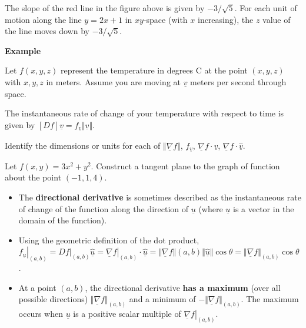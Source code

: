 \documentclass[12pt,letterpaper,noanswers]{exam}
\newcommand{\mb}[1]{\underline{#1}}
\begin{document}
The slope of the red line in the figure above is given by $-3/\sqrt{5}$.  For each unit of motion along the line $y = 2x+1$ in $xy$-space (with $x$ increasing), the $z$ value of the line moves down by $-3/\sqrt{5}$.



\noindent\textbf{Example}

 Let $f(x,y,z)$ represent the temperature in degrees C at the point $(x,y,z)$ with $x,y,z$ in meters.  Assume you are moving at $\mb{v}$ meters per second through space.

The instantaneous rate of change of your temperature with respect to time is given by $[Df] \mb{v} = f_{\mb{v}}\Vert \mb{v}\Vert.$

Identify the dimensions or units for each of $\Vert \mb{\nabla} f\Vert$, $f_{\mb{v}}$, $\mb{\nabla} f\cdot \mb{v}$, $\mb{\nabla} f\cdot \hat{\mb{v}}$.
\vspace{1in}


\item Let $f(x,y) = 3x^2+y^2$.  Construct a tangent plane to the graph of function about the point $(-1,1,4)$.


\begin{tcolorbox}
\begin{itemize}
    \item The \textbf{directional derivative} is sometimes described as the instantaneous rate of change of the function along the direction of $\mb{u}$ (where $\mb{u}$ is a vector in the domain of the function).
    \item Using the geometric definition of the dot product, $\left.f_{\mb{ u}}\right\vert_{(a,b)} = \left.Df\right\vert_{(a,b)}\hat{\mb{u}} = \left.\mb{\nabla}f\right\vert_{(a,b)}\cdot \hat{\mb{u}} = \Vert \mb{\nabla}f\Vert{(a,b)}\Vert\hat{\mb{u}}\Vert\cos\theta = \Vert \mb{\nabla}f\Vert_{(a,b)}\cos\theta$.
    \item At a point $(a,b)$, the directional derivative \textbf{has a maximum} (over all possible directions) $\Vert \mb{\nabla}f\Vert_{(a,b)}$ and a minimum of $-\Vert \mb{\nabla}f\Vert_{(a,b)}$.  The maximum occurs when $\mb{u}$ is a positive scalar multiple of $ \left.\mb{\nabla}f\right\vert_{(a,b)}$.
\end{itemize}
\end{tcolorbox}
\end{document}
